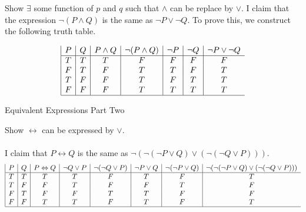 \documentclass[12pt]{article}
\begin{document}
Show $\exists$ some function of $p$ and $q$ such that $\wedge$ can be replace by $\vee$. I claim that the expression  $\lnot(P \wedge Q)$ is the same as $\neg P \vee \lnot Q$. To prove this, we construct the following truth table.

\begin{displaymath}
\begin{array}{|c|c|c|c|c|c|c}
   P
 & Q
 & P\land{}Q
 & \lnot{}(P\land{}Q)
 & \lnot{}P
 & \lnot{}Q
 & \lnot{}P\lor{}\lnot{}Q \\
\hline
T & T & T & F & F & F & F \\
F & T & F & T & T & F & T \\
T & F & F & T & F & T & T \\
F & F & F & T & T & T & T \\
\hline
\end{array}
\end{displaymath}

\problem Equivalent Expressions Part Two

Show $\leftrightarrow$ can be expressed by $\vee$. \\ \\ I claim that $P \leftrightarrow Q$ is the same as $\lnot{}(\lnot{}(\lnot{}P\lor{}Q)\lor{}(\lnot{}(\lnot{}Q\lor{}P)))$.
\begin{displaymath}
\begin{array}{|c|c|c|c|c|c|c|c}
   P
 & Q
 & P\Leftrightarrow{}Q
 & \lnot{}Q\lor{}P
 & \lnot{}(\lnot{}Q\lor{}P)
 & \lnot{}P\lor{}Q
 & \lnot{}(\lnot{}P\lor{}Q)
 & \lnot{}(\lnot{}(\lnot{}P\lor{}Q)\lor{}(\lnot{}(\lnot{}Q\lor{}P))) \\
\hline
T & T & T & T & F & T & F & T \\
T & F & F & T & F & F & T & F \\
F & T & F & F & T & T & F & F \\
F & F & T & T & F & T & F & T \\
\hline
\end{array}
\end{displaymath}
\end{document}
